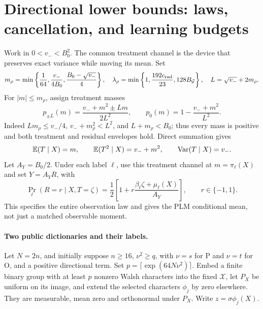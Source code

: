 \documentclass{article}
\theoremstyle{definition}
\theoremstyle{remark}
\begin{document}
\section{Directional lower bounds: laws, cancellation, and learning budgets}
\label{sec:lower}
Work in \(0<v_-<B_0^2\). The common treatment channel is the device that preserves exact variance while moving its mean. Set
\[
 m_\rho=\min\left\{\frac1{64},\frac{v_-}{4B_0},\frac{B_0-\sqrt{v_-}}4\right\},
 \quad\lambda_\rho=\min\left\{1,\frac{192c_{\rm rad}}{23},128B_{\mathcal G}\right\},
 \quad L=\sqrt{v_-}+2m_\rho.
\]
For \(|m|\le m_\rho\), assign treatment masses
\begin{equation}
 p_{\pm L}(m)=\frac{v_-+m^2\pm Lm}{2L^2},\qquad
 p_0(m)=1-\frac{v_-+m^2}{L^2}.
 \label{eq:treatment-channel}
\end{equation}
Indeed \(Lm_\rho\le v_-/4\), \(v_-+m_\rho^2<L^2\), and \(L+m_\rho<B_0\); thus every mass is positive and both treatment and residual envelopes hold. Direct summation gives
\[
 \mathbb E(T\mid X)=m,\qquad \mathbb E(T^2\mid X)=v_-+m^2,
 \qquad\operatorname{Var}(T\mid X)=v_-.
\]
Let \(A_Y=B_0/2\). Under each label \(\ell\), use this treatment channel at \(m=\pi_\ell(X)\) and set \(Y=A_YR\), with
\begin{equation}
 \Pr_\ell(R=r\mid X,T=\zeta)=\frac12\left[1+r\frac{\beta_\ell \zeta+\mu_\ell(X)}{A_Y}\right],
 \qquad r\in\{-1,1\}.
 \label{eq:response-channel}
\end{equation}
This specifies the entire observation law and gives the PLM conditional mean, not just a matched observable moment.

\paragraph{Two public dictionaries and their labels.}
Let \(N=2n\), and initially suppose \(n\ge16\), \(\nu^2\ge q\), with \(\nu=s\) for P and \(\nu=t\) for O, and a positive directional term. Set \(p=\lceil\exp(64N\nu^2)\rceil\). Embed a finite binary group with at least \(p\) nonzero Walsh characters into the fixed \(\mathcal X\), let \(P_X\) be uniform on its image, and extend the selected characters \(\phi_j\) by zero elsewhere. They are measurable, mean zero and orthonormal under \(P_X\). Write \(z=\sigma\phi_j(X)\).
\end{document}
